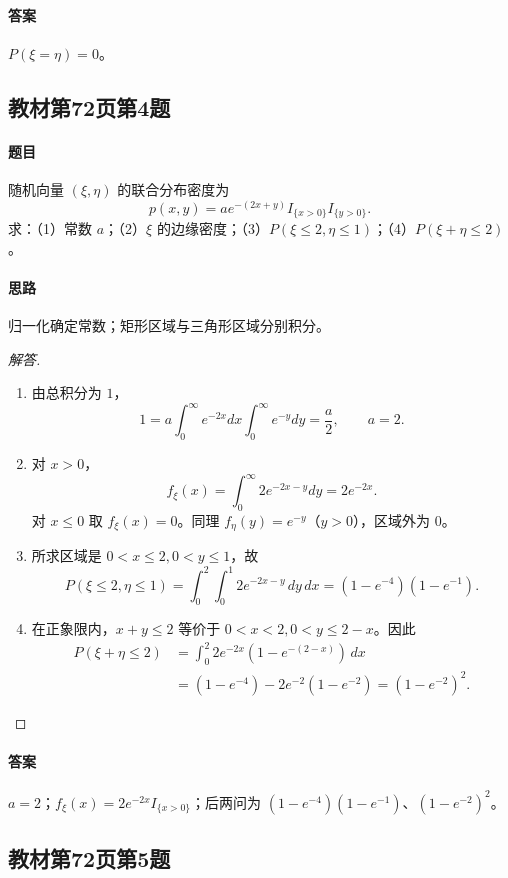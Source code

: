 \paragraph{答案}$P(\xi=\eta)=0$。

\subsection{教材第72页第4题}\label{ex:w10-b72-4}
\paragraph{题目}
随机向量 $(\xi,\eta)$ 的联合分布密度为
\[
p(x,y)=ae^{-(2x+y)}I_{\{x>0\}}I_{\{y>0\}}.
\]
求：（1）常数 $a$；（2）$\xi$ 的边缘密度；（3）$P(\xi\leq2,\eta\leq1)$；（4）$P(\xi+\eta\leq2)$。
\paragraph{思路}归一化确定常数；矩形区域与三角形区域分别积分。
\begin{proof}[解答]
\begin{enumerate}
\item 由总积分为 $1$，
\[
1=a\int_0^\infty e^{-2x}dx\int_0^\infty e^{-y}dy=\frac a2,
\qquad a=2.
\]
\item 对 $x>0$，
\[
f_\xi(x)=\int_0^\infty2e^{-2x-y}dy=2e^{-2x}.
\]
对 $x\leq0$ 取 $f_\xi(x)=0$。同理 $f_\eta(y)=e^{-y}$（$y>0$），区域外为 $0$。
\item 所求区域是 $0<x\leq2,0<y\leq1$，故
\[
P(\xi\leq2,\eta\leq1)=\int_0^2\int_0^1 2e^{-2x-y}\,dy\,dx
=(1-e^{-4})(1-e^{-1}).
\]
\item 在正象限内，$x+y\leq2$ 等价于 $0<x<2,0<y\leq2-x$。因此
\begin{align*}
P(\xi+\eta\leq2)
&=\int_0^2 2e^{-2x}(1-e^{-(2-x)})\,dx\\
&=(1-e^{-4})-2e^{-2}(1-e^{-2})
=(1-e^{-2})^2.
\end{align*}
\end{enumerate}
\end{proof}
\paragraph{答案}$a=2$；$f_\xi(x)=2e^{-2x}I_{\{x>0\}}$；后两问为 $(1-e^{-4})(1-e^{-1})$、$(1-e^{-2})^2$。

\subsection{教材第72页第5题}\label{ex:w10-b72-5}
